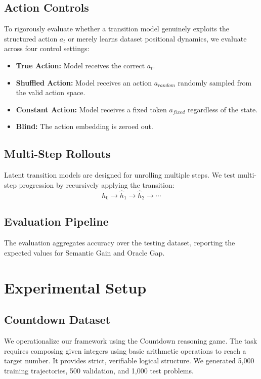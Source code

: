 \documentclass[conference]{IEEEtran}
\begin{document}
\subsection{Action Controls}
To rigorously evaluate whether a transition model genuinely exploits the structured action $a_t$ or merely learns dataset positional dynamics, we evaluate across four control settings:
\begin{itemize}
    \item \textbf{True Action:} Model receives the correct $a_t$.
    \item \textbf{Shuffled Action:} Model receives an action $a_{random}$ randomly sampled from the valid action space.
    \item \textbf{Constant Action:} Model receives a fixed token $a_{fixed}$ regardless of the state.
    \item \textbf{Blind:} The action embedding is zeroed out.
\end{itemize}

\subsection{Multi-Step Rollouts}
Latent transition models are designed for unrolling multiple steps. We test multi-step progression by recursively applying the transition:
\begin{equation}
h_0 \rightarrow \hat h_1 \rightarrow \hat h_2 \rightarrow \cdots
\end{equation}

\subsection{Evaluation Pipeline}
The evaluation aggregates accuracy over the testing dataset, reporting the expected values for Semantic Gain and Oracle Gap.

\section{Experimental Setup}

\subsection{Countdown Dataset}
We operationalize our framework using the Countdown reasoning game. The task requires composing given integers using basic arithmetic operations to reach a target number. It provides strict, verifiable logical structure. We generated 5,000 training trajectories, 500 validation, and 1,000 test problems.
\end{document}
